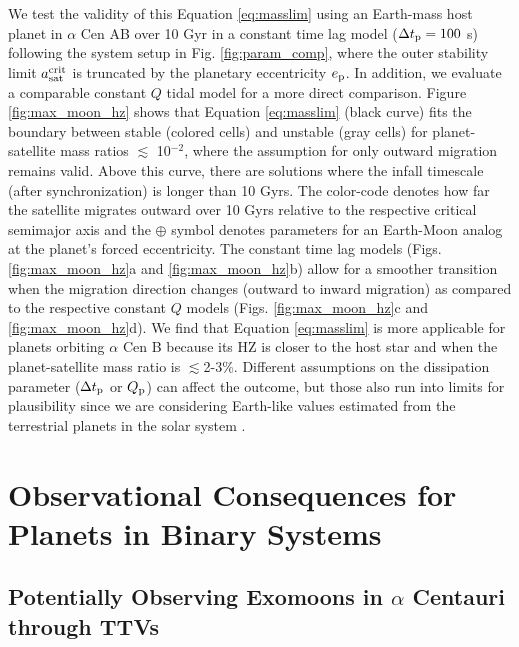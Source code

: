 \documentclass[preprint]{aastex63}
\begin{document}
We test the validity of this Equation \ref{eq:masslim} using an Earth-mass host planet in $\alpha$ Cen AB over 10 Gyr in a constant time lag model ($\Delta t_{\rm p} = 100$ s) following the system setup in Fig. \ref{fig:param_comp}, where the outer stability limit $a_{\rm sat}^{\rm crit}$ is truncated by the planetary eccentricity $e_{\rm p}$.  In addition, we evaluate a comparable constant $Q$ tidal model for a more direct comparison.  Figure \ref{fig:max_moon_hz} shows that Equation \ref{eq:masslim} (black curve) fits the boundary between stable (colored cells) and unstable (gray cells) for planet-satellite mass ratios $\lesssim$ 10$^{-2}$, where the assumption for only outward migration remains valid.  Above this curve, there are solutions where the infall timescale (after synchronization) is longer than 10 Gyrs.  The color-code denotes how far the satellite migrates outward over 10 Gyrs relative to the respective critical semimajor axis and the $\oplus$ symbol denotes parameters for an Earth-Moon analog at the planet's forced eccentricity.  The constant time lag models (Figs. \ref{fig:max_moon_hz}a and \ref{fig:max_moon_hz}b) allow for a smoother transition when the migration direction changes (outward to inward migration) as compared to the respective constant $Q$ models (Figs. \ref{fig:max_moon_hz}c and \ref{fig:max_moon_hz}d).  We find that Equation \ref{eq:masslim} is more applicable for planets orbiting $\alpha$ Cen B because its HZ is closer to the host star and when the planet-satellite mass ratio is $\lesssim$2-3\%.  Different assumptions on the dissipation parameter ($\Delta t_{\rm p}$ or $Q_{\rm p}$) can affect the outcome, but those also run into limits for plausibility since we are considering Earth-like values estimated from the terrestrial planets in the solar system \citep{Quarles2020b}.

\section{Observational Consequences for Planets in Binary Systems} \label{sec:observ}

\subsection{Potentially Observing Exomoons in $\alpha$ Centauri through TTVs} \label{sec:TTVs}
\end{document}
